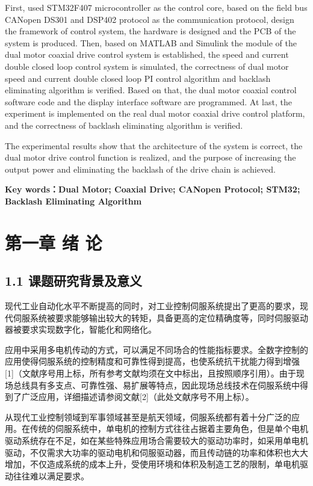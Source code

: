 \documentclass[UTF8,zihao=-4,openany,oneside]{ctexbook}
\begin{document}
First, used STM32F407 microcontroller as the control core, based on the field bus CANopen DS301 and DSP402 protocol as the communication protocol, design the framework of control system, the hardware is designed and the PCB of the system is produced. Then, based on MATLAB and Simulink the module of the dual motor coaxial drive control system is established, the speed and current double closed loop control system is simulated, the correctness of dual motor speed and current double closed loop PI control algorithm and backlash eliminating algorithm is verified. Based on that, the dual motor coaxial control software code and the display interface software are programmed. At last, the experiment is implemented on the real dual motor coaxial drive control platform, and the correctness of backlash eliminating algorithm is verified.

The experimental results show that the architecture of the system is correct, the dual motor drive control function is realized, and the purpose of increasing the output power and eliminating the backlash of the drive chain is achieved.

\noindent\textbf{Key words：Dual Motor; Coaxial Drive; CANopen Protocol; STM32; Backlash Eliminating Algorithm}

\clearpage
\tableofcontents
\clearpage
\mainmatter
{}
\setcounter{page}{1}
\chapter{第一章 绪 论}

\section{1.1 课题研究背景及意义}

现代工业自动化水平不断提高的同时，对工业控制伺服系统提出了更高的要求，现代伺服系统被要求能够输出较大的转矩，具备更高的定位精确度等，同时伺服驱动器被要求实现数字化，智能化和网络化。

应用中采用多电机传动的方式，可以满足不同场合的性能指标要求。全数字控制的应用使得伺服系统的控制精度和可靠性得到提高，也使系统抗干扰能力得到增强[1]（文献序号用上标，所有参考文献均须在文中标出，且按照顺序引用）。由于现场总线具有多支点、可靠性强、易扩展等特点，因此现场总线技术在伺服系统中得到了广泛应用，详细描述请参阅文献[2]（此处文献序号不用上标）。

从现代工业控制领域到军事领域甚至是航天领域，伺服系统都有着十分广泛的应用。在传统的伺服系统中，单电机的控制方式往往占据着主要角色，但是单个电机驱动系统存在不足，如在某些特殊应用场合需要较大的驱动功率时，如采用单电机驱动，不仅需求大功率的驱动电机和伺服驱动器，而且传动链的功率和体积也大大增加，不仅造成系统的成本上升，受使用环境和体积及制造工艺的限制，单电机驱动往往难以满足要求。
\end{document}

